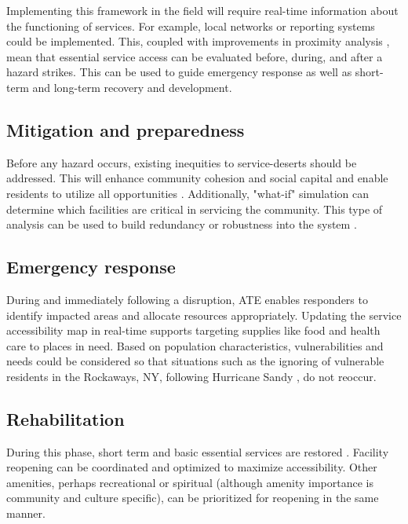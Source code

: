 \documentclass[9pt,twocolumn,twoside,lineno]{pnas-new}
\begin{document}
Implementing this framework in the field will require real-time information about the functioning of services.
For example, local networks or reporting systems could be implemented.
This, coupled with improvements in proximity analysis \cite{Logan2017-fr, noel2019-pypi}, mean that essential service access can be evaluated before, during, and after a hazard strikes.
This can be used to guide emergency response as well as short-term and long-term recovery and development. 

\subsection*{Mitigation and preparedness}
Before any hazard occurs, existing inequities to service-deserts should be addressed.
This will enhance community cohesion and social capital \cite{Dempsey2011-og} and enable residents to utilize all opportunities \cite{Cutter2010-vg}.
Additionally, "what-if" simulation can determine which facilities are critical in servicing the community. 
This type of analysis can be used to build redundancy or robustness into the system \cite{Wardekker2010-hw}.

\subsection*{Emergency response}
During and immediately following a disruption, ATE enables responders to identify impacted areas and allocate resources appropriately. 
Updating the service accessibility map in real-time supports targeting supplies like food and health care to places in need. 
Based on population characteristics, vulnerabilities and needs could be considered so that situations such as the ignoring of vulnerable residents in the Rockaways, NY, following Hurricane Sandy \cite{Subaiya2014-qx}, do not reoccur. 

\subsection*{Rehabilitation} 
During this phase, short term and basic essential services are restored \cite{Resendiz-Vazquez2019-ol}. 
Facility reopening can be coordinated and optimized to maximize accessibility. 
Other amenities, perhaps recreational or spiritual \cite{United_Nations_Educational_Scientific_and_Cultural_Organization2018-sf} (although amenity importance is community and culture specific), can be prioritized for reopening in the same manner.
\end{document}
